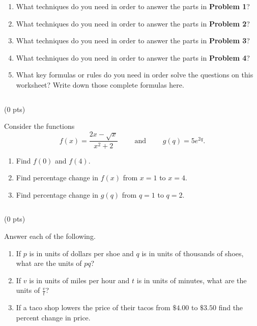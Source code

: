 \documentclass[12pt]{ximera}
\begin{document}
\begin{enumerate}[label=(\alph*)]
    \item What techniques do you need in order to answer the parts in \textbf{Problem 1}? \vspace{3cm}
    \item What techniques do you need in order to answer the parts in \textbf{Problem 2}? \vspace{3cm}
    \item What techniques do you need in order to answer the parts in \textbf{Problem 3}? \vspace{3cm}
    \item What techniques do you need in order to answer the parts in \textbf{Problem 4}? \vspace{3cm}
    \item What key formulas or rules do you need in order solve the questions on this worksheet? Write down those complete formulas here. 
\end{enumerate}

\newpage $\,$
\newpage



 (0 pts)

Consider the functions $$f(x)=\frac{2x-\sqrt{x}}{x^2+2}\qquad\text{ and }\qquad g(q)=5e^{2q}.$$

     \begin{enumerate}[label=(\alph*)]
        \item Find $f(0)$ and $f(4)$. \vspace{5cm}
        \item Find percentage change in $f(x)$ from $x=1$ to $x=4$. \vspace{5cm}
        \item Find percentage change in $g(q)$ from $q=1$ to $q=2$. 
    \end{enumerate}


\newpage $\,$
\newpage


 (0 pts)

Answer each of the following.

\begin{enumerate}[label=(\alph*)]
    \item If $p$ is in units of dollars per shoe and $q$ is in units of thousands of shoes, what are the units of $pq$? \vspace{5cm}
    \item If $v$ is in units of miles per hour and $t$ is in units of minutes, what are the units of $\frac{v}{t}$? \vspace{5cm}
    \item If a taco shop lowers the price of their tacos from $\$4.00$ to $\$3.50$ find the percent change in price. 
\end{enumerate}
\end{document}
